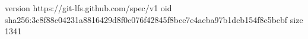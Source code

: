version https://git-lfs.github.com/spec/v1
oid sha256:3c8f88c04231a8816429d8f0c076f42845f8bce7e4aeba97b1dcb154f8c5bcbf
size 1341
